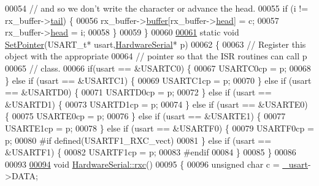 \begin{DoxyCode}
00054     \textcolor{comment}{// and so we don't write the character or advance the head.}
00055     \textcolor{keywordflow}{if} (i != rx\_buffer->\hyperlink{structring__buffer_a4d06965736f37f64f15bbd0ca9457771}{tail}) \{
00056         rx\_buffer->\hyperlink{structring__buffer_a11b70d4a150ea9750e4102706d6ee0b8}{buffer}[rx\_buffer->\hyperlink{structring__buffer_ac1b620f2e27c3af75e68bd1645a2f5f0}{head}] = c;
00057         rx\_buffer->\hyperlink{structring__buffer_ac1b620f2e27c3af75e68bd1645a2f5f0}{head} = i;
00058     \}
00059 \}
00060 
\hypertarget{_hardware_serial_8cpp_source_l00061}{}\hyperlink{_hardware_serial_8cpp_aaec4e4f887a958cc22dd447565d7080b}{00061} \textcolor{keyword}{static} \textcolor{keywordtype}{void} \hyperlink{_hardware_serial_8cpp_aaec4e4f887a958cc22dd447565d7080b}{SetPointer}(USART\_t* usart,\hyperlink{class_hardware_serial}{HardwareSerial}* p)
00062 \{
00063     \textcolor{comment}{// Register this object with the appropriate}
00064     \textcolor{comment}{// pointer so that the ISR routines can call p}
00065     \textcolor{comment}{// class.}
00066     \textcolor{keywordflow}{if}(usart == &USARTC0) \{
00067         USARTC0cp = p;
00068     \} \textcolor{keywordflow}{else} \textcolor{keywordflow}{if} (usart == &USARTC1) \{
00069         USARTC1cp = p;
00070     \} \textcolor{keywordflow}{else} \textcolor{keywordflow}{if} (usart ==  &USARTD0) \{
00071         USARTD0cp = p;
00072     \} \textcolor{keywordflow}{else} \textcolor{keywordflow}{if} (usart ==  &USARTD1) \{
00073         USARTD1cp = p;
00074     \} \textcolor{keywordflow}{else} \textcolor{keywordflow}{if} (usart ==  &USARTE0) \{
00075         USARTE0cp = p;
00076     \} \textcolor{keywordflow}{else} \textcolor{keywordflow}{if} (usart ==  &USARTE1) \{
00077         USARTE1cp = p;
00078     \} \textcolor{keywordflow}{else} \textcolor{keywordflow}{if} (usart ==  &USARTF0) \{
00079         USARTF0cp = p;
00080 \textcolor{preprocessor}{#if defined(USARTF1\_RXC\_vect)}
00081 \textcolor{preprocessor}{}    \} \textcolor{keywordflow}{else} \textcolor{keywordflow}{if} (usart ==  &USARTF1) \{
00082         USARTF1cp = p;
00083 \textcolor{preprocessor}{#endif}
00084 \textcolor{preprocessor}{}    \}
00085 \}
00086 
00093 
\hypertarget{_hardware_serial_8cpp_source_l00094}{}\hyperlink{class_hardware_serial_ac52002a727070c45b765d0dc55106cad}{00094} \textcolor{keywordtype}{void} \hyperlink{class_hardware_serial_ac52002a727070c45b765d0dc55106cad}{HardwareSerial::rxc}()
00095 \{
00096     \textcolor{keywordtype}{unsigned} \textcolor{keywordtype}{char} c = \hyperlink{class_hardware_serial_a3a3bd56aa561ae7e1eb1fd252b5b69a0}{_usart}->DATA;

\end{DoxyCode}
